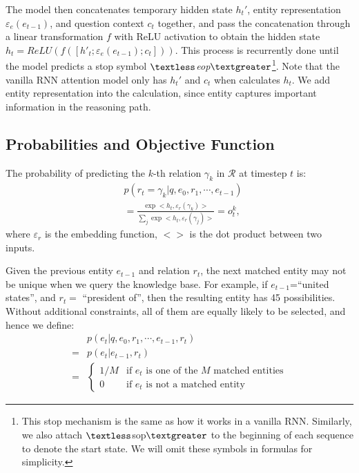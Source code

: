The model then concatenates temporary hidden state $h_{t}'$, entity representation $\varepsilon_e(e_{t-1})$, and question context $c_t$ together, and pass the concatenation through a linear transformation $f$ with ReLU activation to obtain the hidden state $h_t=ReLU(f([h'_{t}; \varepsilon_e(e_{t-1}); c_t]))$. This process is recurrently done until the model predicts a stop symbol \textit{$\textless$eop$\textgreater$}\footnote{This stop mechanism is the same as how it works in a vanilla RNN. Similarly, we also attach $\textless$sop$\textgreater$ to the beginning of each sequence to denote the start state. We will omit these symbols in formulas for simplicity.}. Note that the vanilla RNN attention model only has $h_{t}'$ and $c_t$ when calculates $h_t$. We add entity representation into the calculation, since entity captures important information in the reasoning path. 

\subsection{Probabilities and Objective Function} 
The probability of predicting the $k$-th relation $\gamma_k$ in $\mathcal{R}$ at timestep $t$ is:
\begin{align*}
&p(r_t=\gamma_k|q,e_0,r_1,\cdots,e_{t-1})\\
 &= \frac{\exp <h_t,\varepsilon_r(\gamma_k)>}{\sum_j\exp <h_t,\varepsilon_r(\gamma_j)>}=o^k_t,
\end{align*}
where $\varepsilon_r$ is the embedding function, $<>$ is the dot product between two inputs.


Given the previous entity $e_{t-1}$ and relation $r_t$, the next matched entity may not be unique when we query the knowledge base. %
For example, if $e_{t-1}$=``united states'', and $r_t=$ ``president of'', then the resulting entity has 45 possibilities. Without additional constraints, all of them are equally likely to be selected, and hence we define:
\begin{align}
  &p(e_t|q,e_0,r_1,\cdots,e_{t-1},r_t)\\\nonumber
  =&p(e_t|e_{t-1},r_t)\\\nonumber
  =&\begin{cases}
  1/M & \text{if }e_t\text{ is one of the }M\text{ matched entities} \\\nonumber
  0 & \text{if }e_t\text{ is not a matched entity}
\end{cases} 
\label{eq:equal}
\end{align}

